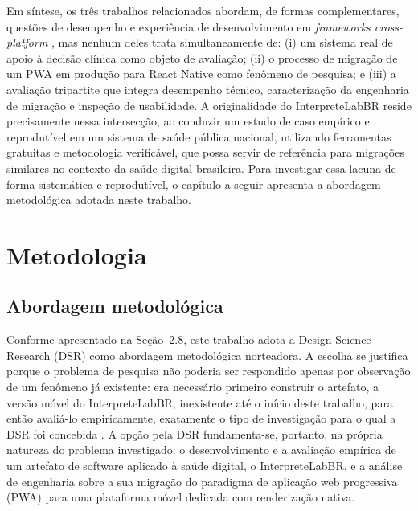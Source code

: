\documentclass[12pt]{article}
\begin{document}
Em síntese, os três trabalhos relacionados abordam, de formas complementares, questões de desempenho e experiência de desenvolvimento em \emph{frameworks cross-platform} \cite{sokolov2025, zhou2024, karin2025}, mas nenhum deles trata simultaneamente de: (i) um sistema real de apoio à decisão clínica como objeto de avaliação; (ii) o processo de migração de um PWA em produção para React Native como fenômeno de pesquisa; e (iii) a avaliação tripartite que integra desempenho técnico, caracterização da engenharia de migração e inspeção de usabilidade. A originalidade do InterpreteLabBR reside precisamente nessa intersecção, ao conduzir um estudo de caso empírico e reprodutível em um sistema de saúde pública nacional, utilizando ferramentas gratuitas e metodologia verificável, que possa servir de referência para migrações similares no contexto da saúde digital brasileira. Para investigar essa lacuna de forma sistemática e reprodutível, o capítulo a seguir apresenta a abordagem metodológica adotada neste trabalho.

\section{Metodologia}

\subsection{Abordagem metodológica}

Conforme apresentado na Seção~2.8, este trabalho adota a Design Science Research (DSR) como abordagem metodológica norteadora. A escolha se justifica porque o problema de pesquisa não poderia ser respondido apenas por observação de um fenômeno já existente: era necessário primeiro construir o artefato, a versão móvel do InterpreteLabBR, inexistente até o início deste trabalho, para então avaliá-lo empiricamente, exatamente o tipo de investigação para o qual a DSR foi concebida \cite{hevner2004, dresch2015}. A opção pela DSR fundamenta-se, portanto, na própria natureza do problema investigado: o desenvolvimento e a avaliação empírica de um artefato de software aplicado à saúde digital, o InterpreteLabBR, e a análise de engenharia sobre a sua migração do paradigma de aplicação web progressiva (PWA) para uma plataforma móvel dedicada com renderização nativa.
\end{document}
